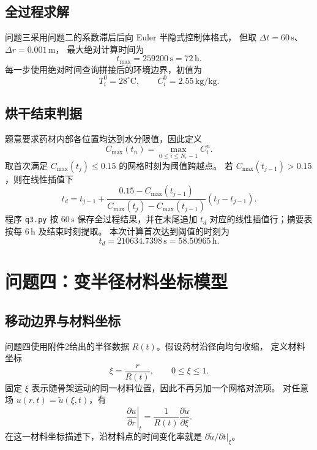 \documentclass[UTF8,a4paper,11pt]{ctexart}
\numberwithin{equation}{section}
\begin{document}
\subsection{全过程求解}

问题三采用问题二的系数滞后后向 Euler 半隐式控制体格式，
但取 \(\Delta t=60\,\mathrm{s}\)、\(\Delta r=0.001\,\mathrm{m}\)，
最大绝对计算时间为
\[
t_{\max}=259200\,\mathrm{s}=72\,\mathrm{h}.
\]
每一步使用绝对时间查询拼接后的环境边界，初值为
\[
T_i^0=28^\circ\mathrm{C},\qquad C_i^0=2.55\,\mathrm{kg/kg}.
\]

\subsection{烘干结束判据}

题意要求药材内部各位置均达到水分限值，因此定义
\begin{equation}
C_{\max}(t_n)=\max_{0\le i\le N_r-1}C_i^n.
\label{eq:q3-Cmax}
\end{equation}
取首次满足 \(C_{\max}(t_j)\le0.15\) 的网格时刻为阈值跨越点。
若 \(C_{\max}(t_{j-1})>0.15\)，则在线性插值下
\begin{equation}
t_d=t_{j-1}+
\frac{0.15-C_{\max}(t_{j-1})}
{C_{\max}(t_j)-C_{\max}(t_{j-1})}
(t_j-t_{j-1}).
\label{eq:q3-dry-time}
\end{equation}
程序 \texttt{q3.py} 按 \(60\,\mathrm{s}\) 保存全过程结果，并在末尾追加
\(t_d\) 对应的线性插值行；摘要表按每 \(6\,\mathrm{h}\) 及结束时刻提取。
本次计算首次达到阈值的时刻为
\[
t_d=210634.7398\,\mathrm{s}=58.50965\,\mathrm{h}.
\]

\section{问题四：变半径材料坐标模型}

\subsection{移动边界与材料坐标}

问题四使用附件2给出的半径数据 \(R(t)\)。假设药材沿径向均匀收缩，
定义材料坐标
\begin{equation}
\xi=\frac{r}{R(t)},\qquad 0\le\xi\le1. \label{eq:q4-xi}
\end{equation}
固定 \(\xi\) 表示随骨架运动的同一材料位置，因此不再另加一个网格对流项。
对任意场 \(u(r,t)=\widetilde u(\xi,t)\)，有
\begin{equation}
\left.\frac{\partial u}{\partial r}\right|_t
=\frac{1}{R(t)}\frac{\partial\widetilde u}{\partial\xi}. \label{eq:q4-chain}
\end{equation}
在这一材料坐标描述下，沿材料点的时间变化率就是
\(\partial\widetilde u/\partial t|_\xi\)。
\end{document}
